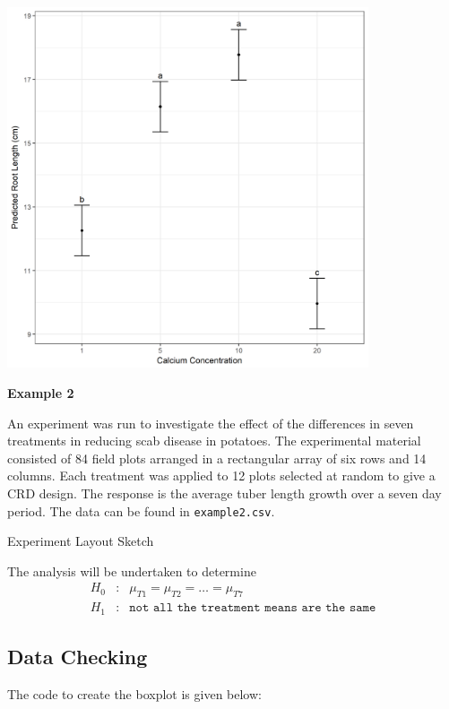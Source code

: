 \documentclass[a4paper, 10pt, fleqn, twosided]{memoir}
\begin{document}
\begin{tcolorbox}[title = Example 1 Graph of predicted values]
\includegraphics[width=0.8\textwidth, frame]{Example1Pred.png}
\end{tcolorbox}

\clearpage

\textbf{Example 2}

An experiment was run to investigate the effect of the differences in seven treatments in reducing scab disease in
potatoes. The experimental material consisted of 84 field plots arranged in a rectangular array of six rows and 14
columns. Each treatment was applied to 12 plots selected at random to give a CRD design. The response is the average
tuber length growth over a seven day period. The data can be found in \texttt{example2.csv}.


\begin{application}{Experiment Layout Sketch}
\vspace{10cm}
\end{application}


The analysis will be undertaken to determine
\begin{eqnarray*}
	H_0&:& \mu_{T1} = \mu_{T2} = \hdots = \mu_{T7} \\
	H_1&:& \texttt{not all the treatment means are the same}
\end{eqnarray*}
\subsection{Data Checking}
The code to create the boxplot is given below:
\end{document}
